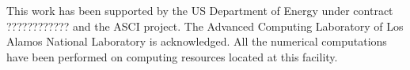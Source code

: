\documentclass[prl,aps,twocolumn,showpacs,twocolumngrid,superbib]{revtex4}
\begin{document}
\begin{acknowledgments}
 This work has been supported by the US Department of Energy 
 under contract ???????????? and the ASCI project.  
 The Advanced Computing Laboratory of Los 
 Alamos National Laboratory is acknowledged.
 All the numerical computations have been
 performed on computing resources located at this facility.
\end{acknowledgments}

\end{document}
